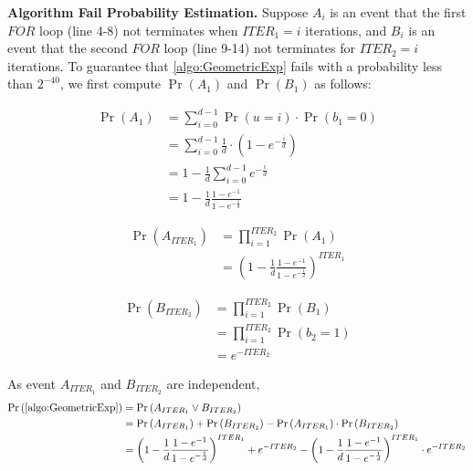 \textbf{Algorithm Fail Probability Estimation. }
Suppose $A_i$ is an event that the first $FOR$ loop (line 4-8) not terminates when $ITER_1=i$ iterations, and $B_i$ is an event that the second $FOR$ loop (line 9-14) not terminates for $ITER_2=i$ iterations.
To guarantee that \autoref{algo:GeometricExp} fails with a probability less than $2^{-40}$, we first compute $\Pr\left(A_1\right)$ and $\Pr\left(B_1\right)$ as follows:



\begin{equation}
    \begin{split}
        \Pr\left(A_1\right) &= \sum_{i=0 }^{d-1}\Pr\left(u=i\right) \cdot \Pr\left(b_1=0\right) \\
        &= \sum_{i=0 }^{d-1}\frac{1}{d} \cdot \left(1-e^{-\frac{i}{d}}\right) \\
        &=1-\frac{1}{d}\sum_{i=0 }^{d-1}e^{-\frac{i}{d}}\\
        &=1-\frac{1}{d}\frac{1-e^{-1}}{1-e^{-\frac{1}{d}}}
    \end{split}
\end{equation}

\begin{equation}
    \begin{split}
        \Pr\left(A_{ITER_1}\right) &= \prod_{i=1}^{ITER_2}\Pr\left(A_1\right) \\
        &=\left(1-\frac{1}{d}\frac{1-e^{-1}}{1-e^{-\frac{1}{d}}}\right) ^{ITER_1}
    \end{split}
\end{equation}

\begin{equation}
    \begin{split}
        \Pr\left(B_{ITER_2}\right) &= \prod_{i=1}^{ITER_2}\Pr\left(B_1\right) \\
        &= \prod_{i=1}^{ITER_2}\Pr\left(b_2=1\right) \\
        &=e^{- ITER_2 }
    \end{split}
\end{equation}

As event $A_{ITER_1}$ and $B_{ITER_2}$ are independent,
\begin{equation}
    \begin{split}
        \Pr\left(\autoref{algo:GeometricExp}\right)  &=\Pr\left(A_{ITER_1}\lor B_{ITER_2} \right)\\
        &= \Pr\left(A_{ITER_1} \right)+   \Pr\left(B_{ITER_2}\right)-\Pr\left(A_{ITER_1} \right)\cdot   \Pr\left(B_{ITER_2}\right)\\
        &=\left(1-\frac{1}{d}\frac{1-e^{-1}}{1-e^{-\frac{1}{d}}}\right) ^{ITER_1} + e^{- ITER_2 }-\left(1-\frac{1}{d}\frac{1-e^{-1}}{1-e^{-\frac{1}{d}}}\right) ^{ITER_1} \cdot e^{- ITER_2 }
    \end{split}
\end{equation}

